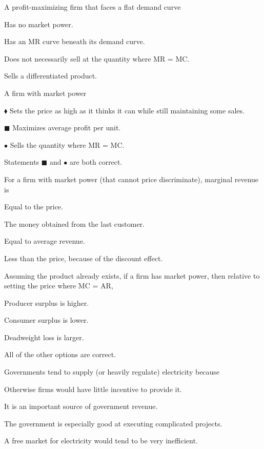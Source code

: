 \documentclass[12pt]{article}
\newcommand{\question}[1]{%
  \Needspace{9\baselineskip}%
  \item #1%
  \vspace{-0.45em}  %
}
\begin{document}
\begin{questions}
  \question{A profit-maximizing firm that faces a flat demand curve}
  \begin{choices}
    \item Has no market power.
    \item Has an MR curve beneath its demand curve.
    \item Does not necessarily sell at the quantity where MR = MC.
    \item Sells a differentiated product.
  \end{choices}


  \question{A firm with market power}
  \begin{choices}
    \item \(\blacklozenge\) Sets the price as high as it thinks it can while still maintaining some sales.
    \item \(\blacksquare\) Maximizes average profit per unit.
    \item \(\bullet\) Sells the quantity where MR = MC.
    \item Statements \(\blacksquare\) and \(\bullet\) are both correct.
  \end{choices}


  \question{For a firm with market power (that cannot price discriminate), marginal revenue is}
  \begin{choices}
    \item Equal to the price.
    \item The money obtained from the last customer.
    \item Equal to average revenue.
    \item Less than the price, because of the discount effect.
  \end{choices}


  \question{Assuming the product already exists, if a firm has market power, then relative to setting the price where MC = AR,}
  \begin{choices}
    \item Producer surplus is higher.
    \item Consumer surplus is lower.
    \item Deadweight loss is larger.
    \item All of the other options are correct.
  \end{choices}


  \question{Governments tend to supply (or heavily regulate) electricity because}
  \begin{choices}
    \item Otherwise firms would have little incentive to provide it.
    \item It is an important source of government revenue.
    \item The government is especially good at executing complicated projects.
    \item A free market for electricity would tend to be very inefficient.
  \end{choices}



\end{questions}
\end{document}
